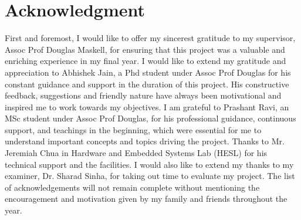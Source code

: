 \chapter*{Acknowledgment} 
\label{ch0ii_Acknowledgement}


First and foremost, I would like to offer my sincerest gratitude to my supervisor, Assoc Prof Douglas Maskell, for ensuring that this project was a valuable and enriching experience in my final year. \newline\newline
I would like to extend my gratitude and appreciation to Abhishek Jain, a Phd student under Assoc Prof Douglas for his constant guidance and support in the duration of this project. His constructive feedback, suggestions and friendly nature have always been motivational and inspired me to work towards my objectives. \newline\newline
I am grateful to Prashant Ravi, an MSc student under Assoc Prof Douglas, for his professional guidance, continuous support, and teachings in the beginning, which were essential for me to understand important concepts and topics driving the project. \newline \newline Thanks to Mr. Jeremiah Chua in Hardware and Embedded Systems Lab (HESL) for his technical support and the facilities.\newline\newline
I would also like to extend my thanks to my examiner, Dr. Sharad Sinha, for taking out time to evaluate my project. \newline\newline
The list of acknowledgements will not remain complete without mentioning the encouragement and motivation given by my family and friends throughout the year. \newline\newline